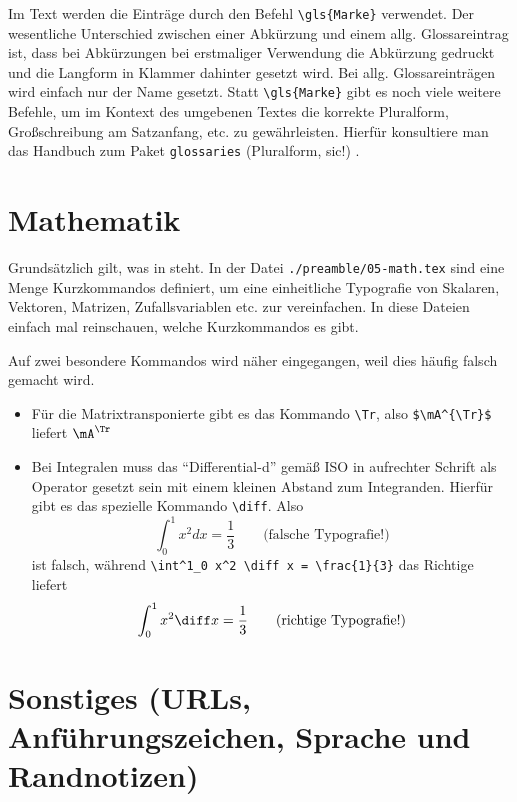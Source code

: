 Im Text werden die Einträge durch den Befehl \verb#\gls{Marke}# verwendet.
Der wesentliche Unterschied zwischen einer Abkürzung und einem allg.
Glossareintrag ist, dass bei Abkürzungen bei erstmaliger Verwendung die
Abkürzung gedruckt und die Langform in Klammer dahinter gesetzt wird.
Bei allg. Glossareinträgen wird einfach nur der Name gesetzt. Statt
\verb#\gls{Marke}# gibt es noch viele weitere Befehle, um im Kontext des
umgebenen Textes die korrekte Pluralform, Großschreibung am Satzanfang, etc.
zu gewährleisten. Hierfür konsultiere man das Handbuch zum Paket \texttt{glossaries}
(Pluralform, sic!) \parencite{talbot2014}.

\section{Mathematik}

Grundsätzlich gilt, was in \parencites{ams1999a}{ams1999b} steht. In der Datei
\texttt{./preamble/05-math.tex} sind eine Menge Kurzkommandos definiert, um eine
einheitliche Typografie von Skalaren, Vektoren,
Matrizen, Zufallsvariablen etc.
zur vereinfachen. In diese Dateien einfach mal reinschauen, welche Kurzkommandos
es gibt.

Auf zwei besondere Kommandos wird näher eingegangen, weil dies häufig falsch
gemacht wird.
\begin{itemize}
  \item Für die Matrixtransponierte gibt es das Kommando \verb#\Tr#, also
	\verb#$\mA^{\Tr}$# liefert $\mA^{\Tr}$
	
	\item Bei Integralen muss das \enquote{Differential-d} gemäß
	ISO in aufrechter Schrift als Operator gesetzt sein mit einem kleinen Abstand
	zum Integranden. Hierfür gibt es das spezielle Kommando \verb#\diff#. Also
	\begin{equation}
	 \int^1_0 x^2 d x = \frac{1}{3} \qquad \text{(falsche Typografie!)}
	\end{equation}
	ist falsch, während \verb#\int^1_0 x^2 \diff x = \frac{1}{3}# das Richtige
	liefert
	\begin{equation}
	 \int^1_0 x^2 \diff x = \frac{1}{3} \qquad \text{(richtige Typografie!)}
	\end{equation}
\end{itemize}

\section{Sonstiges (URLs, Anführungszeichen, Sprache und Randnotizen)}

